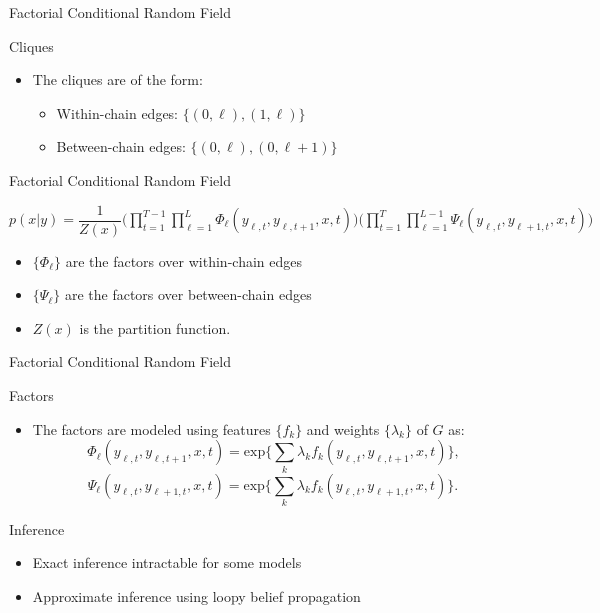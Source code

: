 \documentclass[presentation,bigger]{beamer}
\begin{document}
\begin{frame}[label={sec:orgheadline14}]{Factorial Conditional Random Field}
\begin{block}{Cliques}
\begin{itemize}
\item The cliques are of the form:
\begin{itemize}
\item Within-chain edges: \text{ }\text{ }\(\{(0,\ell),(1,\ell)\}\)
\item Between-chain edges: \(\{(0,\ell),(0,\ell+1)\}\)
\end{itemize}
\end{itemize}
\end{block}
\end{frame}
\begin{frame}[label={sec:orgheadline15}]{Factorial Conditional Random Field}
\begin{definition}
\(p(x|y) = \dfrac{1}{Z(x)}\Bigg(\displaystyle\prod_{t=1}^{T-1}\prod_{\ell=1}^{L}\Phi_\ell(y_{\ell,t},y_{\ell,t+1},x,t)\Bigg)\Bigg(\prod_{t=1}^{T}\prod_{\ell=1}^{L-1}\Psi_\ell(y_{\ell,t},y_{\ell+1,t},x,t)\Bigg)\)
\begin{itemize}
\item \(\{\Phi_\ell\}\) are the factors over within-chain edges
\item \(\{\Psi_\ell\}\) are the factors over between-chain edges
\item \(Z(x)\) is the partition function.
\end{itemize}
\end{definition}
\end{frame}
\begin{frame}[label={sec:orgheadline16}]{Factorial Conditional Random Field}
\begin{block}{Factors}
\begin{itemize}
\item The factors are modeled using features \(\{f_k\}\) and weights \(\{\lambda_k\}\) of \(G\) as:
\[\Phi_\ell(y_{\ell,t},y_{\ell,t+1},x,t) = \text{exp}\Bigg\{\sum_k\lambda_k f_k(y_{\ell,t},y_{\ell,t+1},x,t)\Bigg\}\text{,}\]
\[\Psi_\ell(y_{\ell,t},y_{\ell+1,t},x,t) = \text{exp}\Bigg\{\sum_k\lambda_k f_k(y_{\ell,t},y_{\ell+1,t},x,t)\Bigg\}\text{.}\]
\end{itemize}
\end{block}
\end{frame}
\begin{frame}[label={sec:orgheadline17}]{Inference}
\begin{itemize}
\item Exact inference intractable for some models
\item Approximate inference using loopy belief propagation
\end{itemize}
\end{frame}
\end{document}
